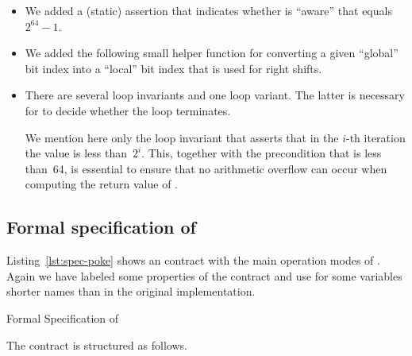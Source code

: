 \begin{itemize}
\item
We added a (static) \acsl assertion that indicates whether \framacwp is ``aware''
that  equals~$2^{64}-1$.

\item
We added the following small helper function for converting a
given ``global'' bit index into a ``local'' bit index that is used for right shifts.

\begin{minipage}{\textwidth}

\end{minipage}
     
\item
There are several loop invariants and one loop variant. 
The latter is necessary for \framacwp to decide whether the loop terminates.

We mention here only the loop invariant that asserts that in the $i$-th iteration
the value  is less than~$2^i$.
This, together with the precondition that 
is less than~64, is essential to ensure that no arithmetic overflow
can occur when computing the return value of \peek.
 
\end{itemize}

\clearpage

\subsection{Formal specification of \poke}
\label{sec:formal-specification-poke}

Listing~\ref{lst:spec-poke} shows an \acsl contract with the 
main operation modes of \poke.
Again we have labeled some properties of the contract
and use for some variables shorter names than in the original implementation.


\begin{listing}[hbt]
\begin{minipage}{\textwidth}

\end{minipage}
\caption{\label{lst:spec-poke} Formal Specification of \poke}
\end{listing}

\clearpage 

The contract is structured as follows.

